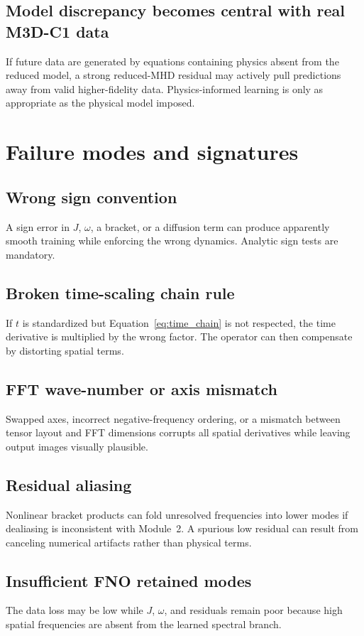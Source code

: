 \documentclass[11pt]{article}
\begin{document}
\subsection{Model discrepancy becomes central with real M3D-C1 data}
If future data are generated by equations containing physics absent from the reduced model, a strong reduced-MHD residual may actively pull predictions away from valid higher-fidelity data. Physics-informed learning is only as appropriate as the physical model imposed.

\section{Failure modes and signatures}
\label{sec:failure}

\subsection{Wrong sign convention}
A sign error in $J$, $\omega$, a bracket, or a diffusion term can produce apparently smooth training while enforcing the wrong dynamics. Analytic sign tests are mandatory.

\subsection{Broken time-scaling chain rule}
If $t$ is standardized but Equation~\eqref{eq:time_chain} is not respected, the time derivative is multiplied by the wrong factor. The operator can then compensate by distorting spatial terms.

\subsection{FFT wave-number or axis mismatch}
Swapped axes, incorrect negative-frequency ordering, or a mismatch between tensor layout and FFT dimensions corrupts all spatial derivatives while leaving output images visually plausible.

\subsection{Residual aliasing}
Nonlinear bracket products can fold unresolved frequencies into lower modes if dealiasing is inconsistent with Module~2. A spurious low residual can result from canceling numerical artifacts rather than physical terms.

\subsection{Insufficient FNO retained modes}
The data loss may be low while $J$, $\omega$, and residuals remain poor because high spatial frequencies are absent from the learned spectral branch.
\end{document}
